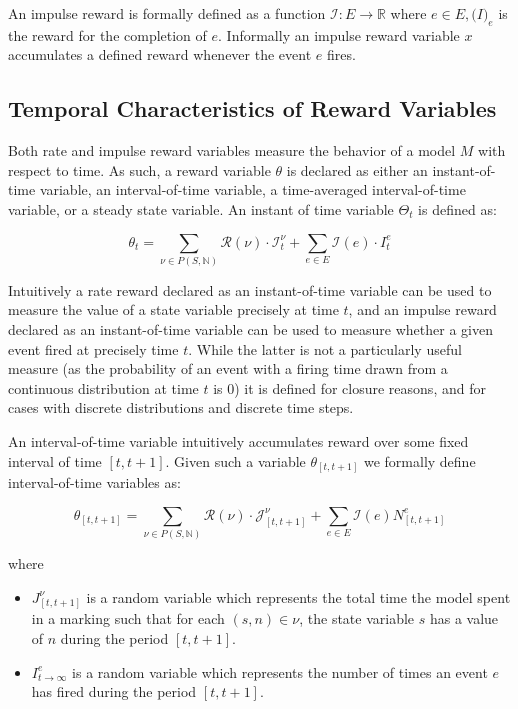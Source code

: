 \documentclass[11pt]{article}
\begin{document}
An impulse reward is formally defined as a function $\mathcal{I}: E \rightarrow \mathbb{R}$ where $e \in E, \mathcal(I)_e$ is the reward for the completion of $e$.  Informally an impulse reward variable $x$ accumulates a defined reward whenever the event $e$ fires.

\subsection{Temporal Characteristics of Reward Variables}

Both rate and impulse reward variables measure the behavior of a model $M$ with respect to time.  As such, a reward variable $\theta$ is declared as either an instant-of-time variable, an interval-of-time variable, a time-averaged interval-of-time variable, or a steady state variable.  An instant of time variable $\Theta_t$ is defined as:

\[ \theta_t = \sum_{\nu \in P(S, \mathbb{N})} \mathcal{R}(\nu) \cdot \mathcal{I}^{\nu}_t + \sum_{e \in E} \mathcal{I}(e) \cdot I_t^e\]

Intuitively a rate reward declared as an instant-of-time variable can be used to measure the value of a state variable precisely at time $t$, and an impulse reward declared as an instant-of-time variable can be used to measure whether a given event fired at precisely time $t$.  While the latter is not a particularly useful measure (as the probability of an event with a firing time drawn from a continuous distribution at time $t$ is $0$) it is defined for closure reasons, and for cases with discrete distributions and discrete time steps.

An interval-of-time variable intuitively accumulates reward over some fixed interval of time $[t, t+1]$.  Given such a variable $\theta_{[t, t+1]}$ we formally define interval-of-time variables as:

\[\theta_{[t,t+1]} = \sum_{\nu \in P(S, \mathbb{N})} \mathcal{R}(\nu) \cdot \mathcal{J}^{\nu}_{[t, t+1]} + \sum_{e \in E} \mathcal{I}(e)N^e_{[t,t+1]}\]

where

\begin{itemize}
\item $J^{\nu}_{[t,t+1]}$ is a random variable which represents the total time the model spent in a marking such that for each $(s, n) \in \nu$, the state variable $s$ has a value of $n$ during the period $[t, t+1]$.
\item $I^e_{t\rightarrow\infty}$ is a random variable which represents the number of times an event $e$ has fired during the period $[t, t+1]$.
\end{itemize}
\end{document}
